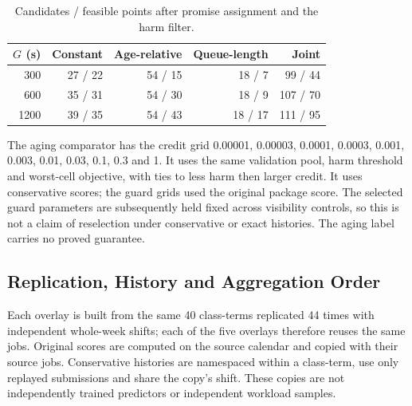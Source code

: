 \documentclass[mathematics,supfile,submit,moreauthors]{Definitions/mdpi}
\newcommand{\devnum}[1]{#1}
\begin{document}
\begin{table}[htbp]
\centering\small
\caption{Candidates / feasible points after promise assignment and the harm filter.}
\label{tab:s_grid_counts}
\begin{tabular}{rrrrr}
\toprule
$G$ (s) & Constant & Age-relative & Queue-length & Joint \\
\midrule
\devnum{300} & \devnum{27} / \devnum{22} & \devnum{54} / \devnum{15} & \devnum{18} / \devnum{7} & \devnum{99} / \devnum{44} \\
\devnum{600} & \devnum{35} / \devnum{31} & \devnum{54} / \devnum{30} & \devnum{18} / \devnum{9} & \devnum{107} / \devnum{70} \\
\devnum{1200} & \devnum{39} / \devnum{35} & \devnum{54} / \devnum{43} & \devnum{18} / \devnum{17} & \devnum{111} / \devnum{95} \\
\bottomrule
\end{tabular}
\end{table}


The aging comparator has the credit grid
\devnum{0.00001}, \devnum{0.00003}, \devnum{0.0001}, \devnum{0.0003},
\devnum{0.001}, \devnum{0.003}, \devnum{0.01}, \devnum{0.03}, \devnum{0.1},
\devnum{0.3} and \devnum{1}. It uses the same validation pool, harm threshold and
worst-cell objective, with ties to less harm then larger credit. It uses
conservative scores; the guard grids used the original package score. The
selected guard parameters are subsequently held fixed across visibility controls,
so this is not a claim of reselection under conservative or exact histories.
The aging label carries no proved guarantee.

\subsection{Replication, History and Aggregation Order}

Each overlay is built from the same \devnum{40} class-terms replicated
\devnum{44} times with independent whole-week shifts; each of the five overlays
therefore reuses the same jobs. Original scores are computed on the source calendar
and copied with their source jobs. Conservative histories are namespaced within a
class-term, use only replayed submissions and share the copy's shift. These copies
are not independently trained predictors or independent workload samples.
\end{document}
